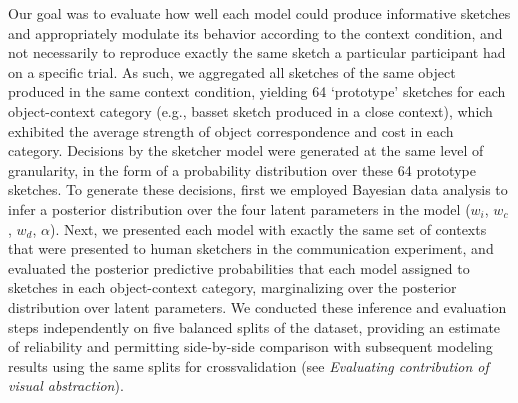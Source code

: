 \documentclass[9pt,twocolumn,twoside]{pnas-new}
\newcommand{\rdh}[1]{{\color{blue}{[rdh: #1]}}}
\begin{document}

Our goal was to evaluate how well each model could produce informative sketches and appropriately modulate its behavior according to the context condition, and not necessarily to reproduce exactly the same sketch a particular participant had on a specific trial. 
As such, we aggregated all sketches of the same object produced in the same context condition, yielding 64 `prototype' sketches for each object-context category (e.g., basset sketch produced in a close context), which exhibited the average strength of object correspondence and cost in each category. 
Decisions by the sketcher model were generated at the same level of granularity, in the form of a probability distribution over these 64 prototype sketches. 
To generate these decisions, first we employed Bayesian data analysis to infer a posterior distribution over the four latent parameters in the model ($w_{i}$, $w_{c}$, $w_{d}$, $\alpha$). 
Next, we presented each model with exactly the same set of contexts that were presented to human sketchers in the communication experiment, and evaluated the posterior predictive probabilities that each model assigned to sketches in each object-context category, marginalizing over the posterior distribution over latent parameters. 
We conducted these inference and evaluation steps independently on five balanced splits of the dataset, providing an estimate of reliability and permitting side-by-side comparison with subsequent modeling results using the same splits for crossvalidation (see \textit{Evaluating contribution of visual abstraction}). 
\end{document}
